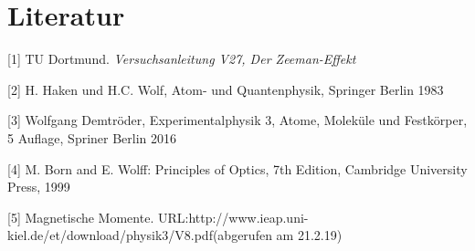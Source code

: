 \section{Literatur}
[1] \; TU Dortmund. \textit{Versuchsanleitung V27, Der Zeeman-Effekt}



[2] \; H. Haken und H.C. Wolf, Atom- und Quantenphysik, Springer Berlin 1983

[3] \; Wolfgang Demtröder, Experimentalphysik 3, Atome, Moleküle und Festkörper, 5 Auflage, Spriner Berlin 2016

[4] \; M. Born and E. Wolff: Principles of Optics, 7th Edition, Cambridge University Press, 1999

[5] \; Magnetische Momente. {URL:http://www.ieap.uni-kiel.de/et/download/physik3/V8.pdf}(abgerufen am 21.2.19)